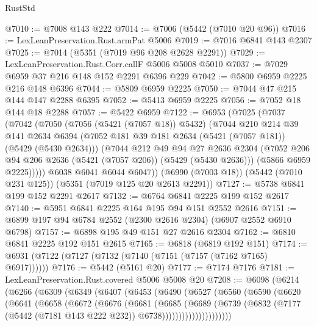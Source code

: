 \begin{lexlean}{RustStd}
\begin{coremodule}
@7010 := @7008 @143 @222
@7014 := @7006 (@5442 (@7010 @20 @96))
@7016 := LexLeanPreservation.Rust.armPat @5006
@7019 := @7016 @6841 @143 @2307
@7025 := @7014 (@5351 (@7019 @96 @208 @2628 @2291))
@7029 := LexLeanPreservation.Rust.Corr.callF @5006 @5008 @5010
@7037 := @7029 @6959 @37 @216 @148 @152 @2291 @6396 @229
@7042 := @5800 @6959 @2225 @216 @148 @6396
@7044 := @5809 @6959 @2225
@7050 := @7044 @47 @215 @144 @147 @2288 @6395
@7052 := @5413 @6959 @2225
@7056 := @7052 @18 @144 @18 @2288
@7057 := @5422 @6959
@7122 := @6953
    (@7025
      (@7037
        (@7042
          (@7050
            (@7056 (@5421 (@7057 @18)) @5432)
            (@7044
              @210
              @214
              @39
              @141
              @2634
              @6394
              (@7052 @181 @39 @181 @2634 (@5421 (@7057 @181)) (@5429 (@5430 @2634)))
              (@7044
                @212
                @49
                @94
                @27
                @2636
                @2304
                (@7052 @206 @94 @206 @2636 (@5421 (@7057 @206)) (@5429 (@5430 @2636)))
                (@5866 @6959 @2225)))))
        @6038
        @6041
        @6044
        @6047))
    (@6990 (@7003 @18))
    (@5442 (@7010 @231 @125))
    (@5351 (@7019 @125 @20 @2613 @2291))
@7127 := @5738 @6841 @199 @152 @2291 @2617
@7132 := @6764 @6841 @2225 @199 @152 @2617
@7140 := @5951 @6841 @2225 @164 @195 @94 @151 @2552 @2616
@7151 := @6899 @197 @94 @6784 @2552 (@2300 @2616 @2304) (@6907 @2552 @6910 @6798)
@7157 := @6898 @195 @49 @151 @27 @2616 @2304
@7162 := @6810 @6841 @2225 @192 @151 @2615
@7165 := @6818 (@6819 @192 @151)
@7174 := @6931 (@7122 (@7127 (@7132 (@7140 (@7151 (@7157 (@7162 @7165) @6917))))))
@7176 := @5442 (@5161 @20)
@7177 := @7174 @7176
@7181 := LexLeanPreservation.Rust.covered @5006 @5008 @20
@7208 := @6098
    (@6214
      (@6266
        (@6309
          (@6349
            (@6407
              (@6453
                (@6490
                  (@6527
                    (@6560
                      (@6590
                        (@6620
                          (@6641
                            (@6658
                              (@6672
                                (@6676
                                  (@6681
                                    (@6685
                                      (@6689
                                        (@6739
                                          (@6832
                                            (@7177
                                              (@5442 (@7181 @143 @222 @232))
                                              @6738)))))))))))))))))))))

\end{coremodule}
\end{lexlean}
